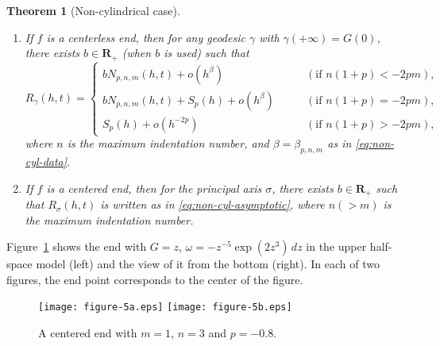 \documentclass[a4paper]{amsart}
\theoremstyle{plain}
\newtheorem{theorem}{Theorem}[section]
\theoremstyle{remark}
\numberwithin{equation}{section}
\begin{document}
\begin{theorem}[Non-cylindrical case]
 
 \begin{enumerate}
  \item\label{item:non-cyl-1}
       If $f$ is a centerless end, then
       for any geodesic $\gamma$ with $\gamma(+\infty)=G(0)$,
       there exists  $b\in{\boldsymbol{R}}_+$ 
       {\rm(}when $b$ is used{\rm )}
       such that
	\begin{equation}\label{eq:non-cyl-asymptotic}
	   R_{\gamma}(h,t)=
          \begin{cases}
	     b N_{p,n,m}(h,t) + o(h^{\beta})\qquad
                 &(\text{if $n(1+p)<-2pm$}),\\
	     bN_{p,n,m}(h,t)+S_p(h)+o(h^{\beta}) \qquad
                 &(\text{if $n(1+p)=-2pm$}),\\
	     S_p(h) + o(h^{-2p})
                 &(\text{if $n(1+p)>-2pm$}),
	   \end{cases}
	\end{equation}
       where $n$ is the maximum indentation number, 
       and $\beta=\beta_{p,n,m}$ as in \eqref{eq:non-cyl-data}.
   \item\label{item:non-cyl-2}
       If $f$ is a centered end, then
	for the principal axis $\sigma$,
       there exists  $b\in{\boldsymbol{R}}_+$ 
       such that
       $R_{\sigma}(h,t)$ is written as in \eqref{eq:non-cyl-asymptotic},
       where $n(>m)$ is the maximum indentation number.
 \end{enumerate}
\endgroup
\end{theorem}
Figure~\ref{fig:nodes} shows the end with $G=z$,
$\omega=-z^{-5}\exp(2z^3)\,dz$ in 
the upper half-space model (left) and the view of it from the
bottom (right).
In each of two figures,
the end point corresponds to the center of the figure.
\begin{figure}
  \begin{center}
   \texttt{[image: figure-5a.eps]}  
   \texttt{[image: figure-5b.eps]} 
  \end{center}
  \caption{    A centered end with $m=1$, $n=3$ and $p=-0.8$.}
  \label{fig:nodes}
\end{figure}
\end{document}

